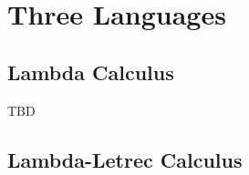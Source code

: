 



















































\section{Three Languages}

\subsection{Lambda Calculus}

TBD

\subsection{Lambda-Letrec Calculus}

